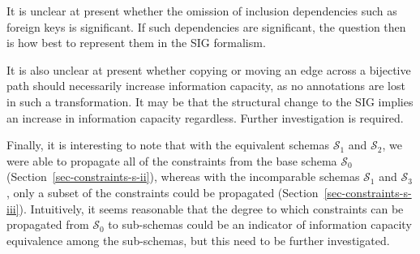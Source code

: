 \documentclass{sig-alternate-05-2015}
\newcounter{constraint}
\newcommand{\SC}[1]{\ensuremath{\mathcal{S}_{#1}}}
\begin{document}
It is unclear at present whether the omission of inclusion dependencies such as foreign keys is significant. If such dependencies are significant, the question then is how best to represent them in the SIG formalism.

It is also unclear at present whether copying or moving an edge across a bijective path should necessarily increase information capacity, as no annotations are lost in such a transformation. It may be that the structural change to the SIG implies an increase in information capacity regardless. Further investigation is required.

Finally, it is interesting to note that with the equivalent schemas \(\SC{1}\) and \(\SC{2}\), we were able to propagate all of the constraints from the base schema \(\SC{0}\) (Section~\ref{sec-constraints-s-ii}), whereas with the incomparable schemas \(\SC{1}\) and \(\SC{3}\), only a subset of the constraints could be propagated (Section~\ref{sec-constraints-s-iii}). Intuitively, it seems reasonable that the degree to which constraints can be propagated from \(\SC{0}\) to sub-schemas could be an indicator of information capacity equivalence among the sub-schemas, but this need to be further investigated.










\end{document}
